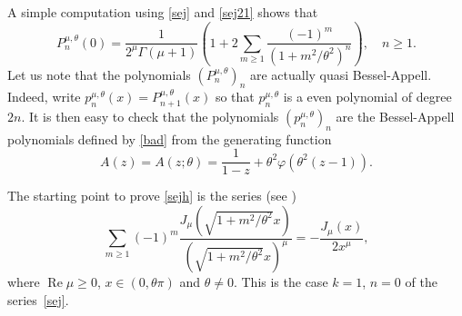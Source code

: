 \documentclass[12pt,leqno]{amsart}
\numberwithin{equation}{section}
\theoremstyle{plain}
\renewcommand{\Re}{\operatorname{Re}}
\begin{document}
A simple computation using \eqref{sej} and \eqref{sej21} shows that
\begin{equation}
\label{sej22}
P_n^{\mu,\theta }(0) = \frac{1}{2^{\mu} \Gamma(\mu+1)}
\left(1+2 \sum_{m\ge1}\frac{(-1)^m}{(1+m^2/\theta ^2)^n}\right), \quad n\ge 1.
\end{equation}
Let us note that the polynomials $(P_n^{\mu,\theta })_n$ are actually quasi Bessel-Appell. Indeed, write $p_n^{\mu,\theta }(x)=P_{n+1}^{\mu,\theta }(x)$ so that $p_n^{\mu,\theta }$ is a even polynomial of degree $2n$. It is then easy to check that the polynomials $(p_n^{\mu,\theta })_n$ are the Bessel-Appell polynomials defined by \eqref{bad} from the generating function
\[
A(z) = A(z;\theta) = \frac{1}{1-z}+\theta^2\varphi(\theta^2(z-1)).
\]

The starting point to prove \eqref{sejh} is the series (see \cite[5.7.22.3, p.~682]{PBM1})
\begin{equation}
\label{sej5}
\sum_{m\ge 1} (-1)^m\frac{J_{\mu}(\sqrt{1+m^2/\theta ^2}x)}
{(\sqrt{1+m^2/\theta ^2}x)^{\mu}} = -\frac{J_\mu(x)}{2x^\mu},
\end{equation}
where $\Re \mu\ge 0$, $x\in (0,\theta \pi)$ and $\theta \not =0$. This is the case $k=1$, $n=0$ of the series~\eqref{sej}.
\end{document}
